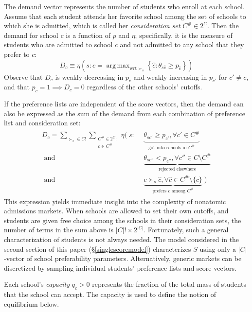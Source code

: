 \documentclass[12pt]{article}
\numberwithin{equation}{subsection}
\theoremstyle{definition}
\DeclareMathOperator*{\argmax}{arg\,max}
\begin{document}
The demand vector represents the number of students who enroll at each school. Assume that each student attends her favorite school among the set of schools to which she is admitted, which is called her \emph{consideration set} $C^\# \in 2^C$. Then the demand for school $c$ is a function of $p$ and $\eta$; specifically, it is the measure of students who are admitted to school $c$ and not admitted to any school that they prefer to $c$:
\begin{equation} \label{demanddefinition}
D_c \equiv \eta\left(s: c = \argmax_{\text{wrt } \succ_s} \left\{\hat c: \theta_{s\hat c} \geq p_{\hat c} \right\}\right)
\end{equation}
Observe that $D_c$ is weakly decreasing in $p_c$ and weakly increasing in $p_{c'}$ for $c' \neq c$, and that $p_c = 1 \implies D_c = 0$ regardless of the other schools' cutoffs.

If the preference lists are independent of the score vectors, then the demand can also be expressed as the sum of the demand from each combination of preference list and consideration set:
\begin{gather} \label{demandbigsum}
\begin{aligned}
D_c = 
\sum_{\succ_s \in C!} \sum_{\substack{C^\# \in 2^{C}:\\ c \in C^\#}}
\eta\Big(\;s:&~~\underbrace{\theta_{sc'} \geq p_{c'}, \forall c' \in C^\#}_{\text{got into schools in } C^\# } \\
\text{ and} &~~\underbrace{\theta_{sc''} < p_{c''}, \forall c'' \in C \setminus C^\#}_{\text{rejected elsewhere}} \\
\text{ and} &~~\underbrace{c \succ_s \hat c, \forall \hat c \in C^\#\setminus \{c\}}_{\text{prefers } c \text{ among } C^\#} \;\Big)
\end{aligned}
\end{gather}
This expression yields immediate insight into the complexity of nonatomic admissions markets. When schools are allowed to set their own cutoffs, and students are given free choice among the schools in their consideration sets, the number of terms in the sum above is $|C|!\times2^{|C|}$. Fortunately, such a general characterization of students is not always needed. The model considered in the second section of this paper (\S\ref{singlescoremodel}) characterizes $S$ using only a $|C|$-vector of school preferability parameters. Alternatively, generic markets can be discretized by sampling individual students' preference lists and score vectors. 

Each school's \emph{capacity} $q_c > 0$ represents the fraction of the total mass of students that the school can accept. The capacity is used to define the notion of equilibrium below. 
\end{document}
